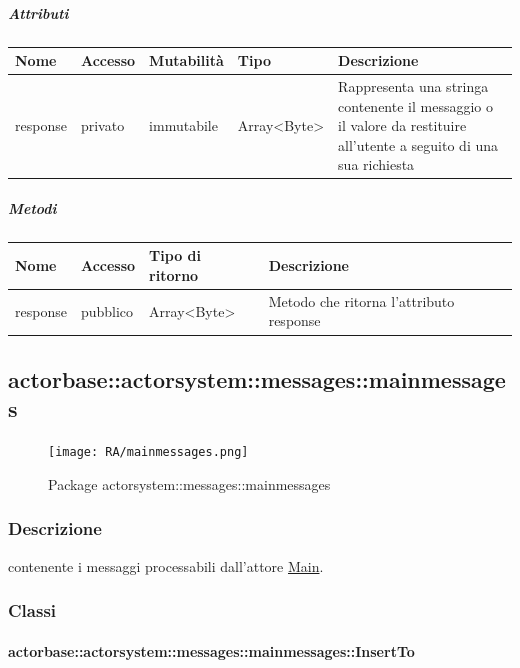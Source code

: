 \documentclass{scalatekids-article}
\begin{document}
\subparagraph{Attributi}
\begin{tabular}{| p{2cm} | p{1.5cm} | p{2cm} | p{3cm} | p{8.5cm} |}
  \hline
  Nome & Accesso & Mutabilità & Tipo & Descrizione\\
  \hline
  response & privato & immutabile & Array<Byte> & Rappresenta una stringa contenente il messaggio o il valore da restituire all'utente a seguito di una sua richiesta\\
  \hline
\end{tabular}

\subparagraph{Metodi}
\begin{tabular}{| p{3cm} | p{1.5cm} | p{3.5cm} | p{9cm} |}
  \hline
  Nome & Accesso & Tipo di ritorno & Descrizione\\
  \hline
  response & pubblico & Array<Byte> & Metodo che ritorna l'attributo response\\
  \hline
\end{tabular}


\subsection{actorbase::actorsystem::messages::mainmessages}
\label{sec:actorbase::actorsystem::messages::mainmessages}

\begin{figure}[H]
  \begin{center}
    \texttt{[image: RA/mainmessages.png]}
    \caption{Package actorsystem::messages::mainmessages}
  \end{center}
\end{figure}

\subsubsection{Descrizione}
 contenente i messaggi processabili dall'attore \hyperref[sec:actorbase::actorsystem::actors::main::Main]{Main}.

\subsubsection{Classi}

\paragraph{actorbase::actorsystem::messages::mainmessages::InsertTo}
\label{sec:actorbase::actorsystem::messages::mainmessages::InsertTo}
\end{document}
